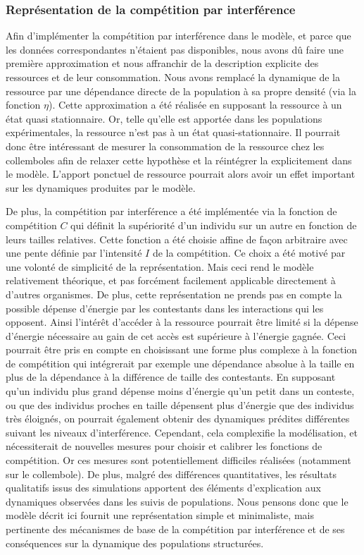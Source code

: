 \subsubsection{Représentation de la compétition par interférence}

Afin d'implémenter la compétition par interférence dans le modèle, et parce que
les données correspondantes n'étaient pas disponibles, nous avons dû faire une
première approximation et nous affranchir de la description explicite des
ressources et de leur consommation. Nous avons remplacé la dynamique de la
ressource par une dépendance directe de la population à sa propre densité (via
la fonction $\eta$). Cette approximation a été réalisée en supposant la
ressource à un état quasi stationnaire. Or, telle qu'elle est apportée dans les
populations expérimentales, la ressource n'est pas à un état quasi-stationnaire.
Il pourrait donc être intéressant de mesurer la consommation de la ressource
chez les collemboles afin de relaxer cette hypothèse et la réintégrer la
explicitement dans le modèle. L'apport ponctuel de ressource pourrait alors
 avoir un effet important sur les dynamiques produites par le modèle.

De plus, la compétition par interférence a été implémentée via la fonction de
compétition $C$ qui définit la supériorité d'un individu sur un autre en
fonction de leurs tailles relatives. Cette fonction a été choisie affine de
façon arbitraire avec une pente définie par l'intensité $I$ de la
compétition. Ce choix a été motivé par une volonté de simplicité de la
représentation. Mais ceci rend le modèle relativement théorique, et pas
forcément facilement applicable directement à d'autres organismes. De plus,
cette représentation ne prends pas en compte la possible dépense d'énergie par les
contestants dans les interactions qui les opposent. Ainsi l'intérêt d'accéder à
la ressource pourrait être limité si la dépense d'énergie nécessaire au gain de
cet accès est supérieure à l'énergie gagnée. Ceci pourrait être pris en compte
en choisissant une forme plus complexe à la fonction de compétition qui
intégrerait par exemple une dépendance absolue à la taille en plus de la
dépendance à la différence de taille des contestants. En supposant qu'un
individu plus grand dépense moins d'énergie qu'un petit dans un conteste, ou que des individus
proches en taille dépensent plus d'énergie que des individus très éloignés, on
pourrait également obtenir des dynamiques prédites différentes suivant les
niveaux d'interférence. Cependant, cela complexifie la modélisation, et
nécessiterait de nouvelles mesures pour choisir et calibrer les fonctions de
compétition. Or ces mesures sont potentiellement difficiles réalisées (notamment
sur le collembole). De plus, malgré des différences quantitatives, les résultats
qualitatifs issus des simulations apportent des éléments d'explication aux
dynamiques observées dans les suivis de populations.
Nous pensons donc que le modèle décrit ici fournit une représentation simple et
minimaliste, mais pertinente des mécanismes de base de la compétition par
interférence et de ses conséquences sur la dynamique des populations
structurées.

